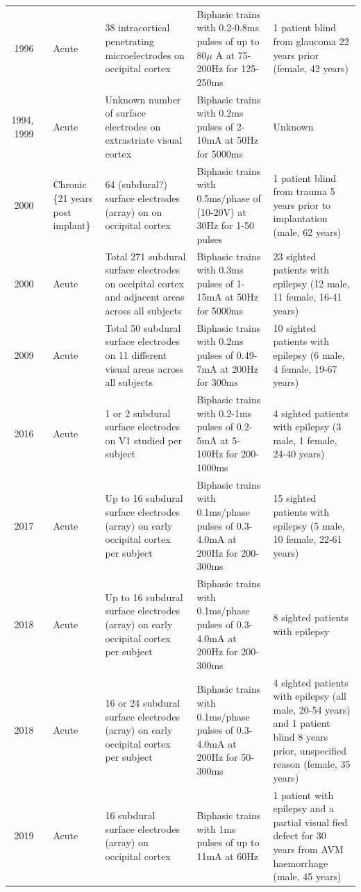 \documentclass[a4paper,11pt,openany]{book}
\begin{document}
\begin{table}
\begin{tabu}{rlXX[2]X[2]X[2]}
1996 & \cite{schmidt_feasibility_1996} & Acute & 38 intracortical penetrating microelectrodes on occipital cortex & Biphasic trains with 0.2-0.8ms pulses of up to 80\(\mu\) A at 75-200Hz for 125-250ms & 1 patient blind from glaucoma 22 years prior (female, 42 years)\\
1994, 1999 & \cite{allison_face_1994,puce_electrophysiological_1999} & Acute & Unknown number of surface electrodes on extrastriate visual cortex & Biphasic trains with 0.2ms pulses of 2-10mA at 50Hz for 5000ms & Unknown\\
2000 & \cite{dobelle_artificial_2000} & Chronic \newline \{\tiny 21 years post implant\} & 64 (subdural?) surface electrodes (array) on on occipital cortex & Biphasic trains with 0.5ms/phase of (10-20V) at 30Hz for 1-50 pulses & 1 patient blind from trauma 5 years prior to implantation (male, 62 years)\\
2000 & \cite{lee_mapping_2000} & Acute & Total 271 subdural surface electrodes on occipital cortex and adjacent areas across all subjects & Biphasic trains with 0.3ms pulses of 1-15mA at 50Hz for 5000ms & 23 sighted patients with epilepsy (12 male, 11 female, 16-41 years)\\
2009 & \cite{murphey_perceiving_2009} & Acute & Total 50 subdural surface electrodes on 11 different visual areas across all subjects & Biphasic trains with 0.2ms pulses of 0.49-7mA at 200Hz for 300ms & 10 sighted patients with epilepsy (6 male, 4 female, 19-67 years)\\
2016 & \cite{winawer_linking_2016} & Acute & 1 or 2 subdural surface electrodes on V1 studied per subject & Biphasic trains with 0.2-1ms pulses of 0.2-5mA at 5-100Hz for 200-1000ms & 4 sighted patients with epilepsy (3 male, 1 female, 24-40 years)\\
2017 & \cite{bosking_saturation_2017} & Acute & Up to 16 subdural surface electrodes (array) on early occipital cortex per subject & Biphasic trains with 0.1ms/phase pulses of 0.3-4.0mA at 200Hz for 200-300ms & 15 sighted patients with epilepsy (5 male, 10 female, 22-61 years)\\
2018 & \cite{bosking_rules_2018} & Acute & Up to 16 subdural surface electrodes (array) on early occipital cortex per subject & Biphasic trains with 0.1ms/phase pulses of 0.3-4.0mA at 200Hz for 200-300ms & 8 sighted patients with epilepsy\\
2018 & \cite{beauchamp_dynamic_2018} & Acute & 16 or 24 subdural surface electrodes (array) on early occipital cortex per subject & Biphasic trains with 0.1ms/phase pulses of 0.3-4.0mA at 200Hz for 50-300ms & 4 sighted patients with epilepsy (all male, 20-54 years) and 1 patient blind 8 years prior, unspecified reason (female, 35 years)\\
2019 & \cite{collins_preserved_2019} & Acute & 16 subdural surface electrodes (array) on occipital cortex & Biphasic trains with 1ms pulses of up to 11mA at 60Hz & 1 patient with epilepsy and a partial visual fied defect for 30 years from AVM haemorrhage (male, 45 years)\\
\end{tabu}
\end{table}
\end{document}
